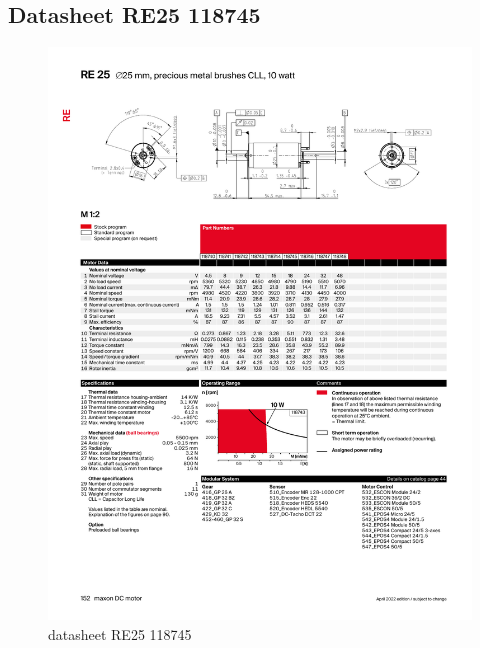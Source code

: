 \documentclass{article}
\begin{document}
\newpage
\begin{appendices}

\section{Datasheet RE25 118745}
\label{app:datasheet motor}
\begin{figure}[htbp]
  \centering %
  \includegraphics[page=1, clip, trim=0cm 0cm 0cm 0cm, scale = 0.65]{datasheet_RE25118745.pdf}
  \caption{datasheet RE25 118745}
  \label{fig:datasheet RE25 118745}
\end{figure}

\newpage


\end{appendices}
\end{document}
